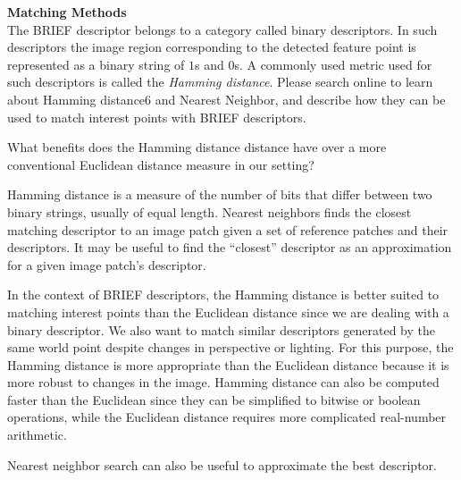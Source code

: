 \newpage
\begin{problem}
  \textbf{Matching Methods} \\
  The BRIEF descriptor belongs to a category called binary descriptors.
  In such descriptors the image region corresponding to the
  detected feature point is represented as a binary string
  of $1$s and $0$s. A commonly used metric used for such descriptors
  is called the \emph{Hamming distance}.
  Please search online to learn about Hamming distance6
  and Nearest Neighbor, and describe how they can be used
  to match interest points with BRIEF descriptors.
  
  \step
  What benefits does the Hamming distance distance have over
  a more conventional Euclidean distance measure in our setting?

  \begin{answer}
    Hamming distance is a measure of the number of bits that
    differ between two binary strings, usually of equal length.
    Nearest neighbors finds the closest matching descriptor to an
    image patch given a set of reference patches and their descriptors.
    It may be useful to find the ``closest'' descriptor as an approximation
    for a given image patch's descriptor.
    
    \step
    In the context of BRIEF descriptors, the Hamming distance is
    better suited to matching interest points than the Euclidean
    distance since we are dealing with a binary descriptor.
    We also want to match similar descriptors generated
    by the same world point despite changes in perspective or lighting.
    For this purpose, the Hamming distance is more appropriate
    than the Euclidean distance because it is more robust to
    changes in the image.
    Hamming distance can also be computed faster than the Euclidean
    since they can be simplified to bitwise or boolean operations,
    while the Euclidean distance requires more complicated
    real-number arithmetic.

    \step
    Nearest neighbor search can also be useful to approximate
    the best descriptor.
  \end{answer}
\end{problem}

